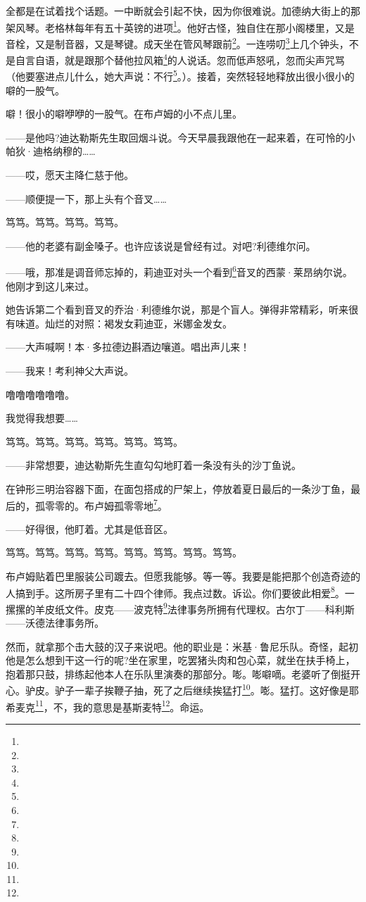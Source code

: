 \par 全都是在试着找个话题。一中断就会引起不快，因为你很难说。加德纳大街上的那架风琴。老格林每年有五十英镑的进项\footnote{}。他好古怪，独自住在那小阁楼里，又是音栓，又是制音器，又是琴键。成天坐在管风琴跟前\footnote{}。一连唠叨\footnote{}上几个钟头，不是自言自语，就是跟那个替他拉风箱\footnote{}的人说话。忽而低声怒吼，忽而尖声咒骂（他要塞进点儿什么，她大声说：不行\footnote{}。）。接着，突然轻轻地释放出很小很小的噼的一股气。
\par 噼！很小的噼咿咿的一股气。在布卢姆的小不点儿里。
\par ——是他吗?迪达勒斯先生取回烟斗说。今天早晨我跟他在一起来着，在可怜的小帕狄·迪格纳穆的……
\par ——哎，愿天主降仁慈于他。
\par ——顺便提一下，那上头有个音叉……
\par 笃笃。笃笃。笃笃。笃笃。
\par ——他的老婆有副金嗓子。也许应该说是曾经有过。对吧?利德维尔问。
\par ——哦，那准是调音师忘掉的，莉迪亚对头一个看到\footnote{}音叉的西蒙·莱昂纳尔说。他刚才到这儿来过。
\par 她告诉第二个看到音叉的乔治·利德维尔说，那是个盲人。弹得非常精彩，听来很有味道。灿烂的对照：褐发女莉迪亚，米娜金发女。
\par ——大声喊啊！本·多拉德边斟酒边嚷道。唱出声儿来！
\par ——我来！考利神父大声说。
\par 噜噜噜噜噜噜。
\par 我觉得我想要……
\par 笃笃。笃笃。笃笃。笃笃。笃笃。笃笃。
\par ——非常想要，迪达勒斯先生直勾勾地盯着一条没有头的沙丁鱼说。
\par 在钟形三明治容器下面，在面包搭成的尸架上，停放着夏日最后的一条沙丁鱼，最后的，孤零零的。布卢姆孤零零地\footnote{}。
\par ——好得很，他盯着。尤其是低音区。
\par 笃笃。笃笃。笃笃。笃笃。笃笃。笃笃。笃笃。笃笃。
\par 布卢姆贴着巴里服装公司踱去。但愿我能够。等一等。我要是能把那个创造奇迹的人搞到手。这所房子里有二十四个律师。我点过数。诉讼。你们要彼此相爱\footnote{}。一摞摞的羊皮纸文件。皮克——波克特\footnote{}法律事务所拥有代理权。古尔丁——科利斯——沃德法律事务所。
\par 然而，就拿那个击大鼓的汉子来说吧。他的职业是：米基·鲁尼乐队。奇怪，起初他是怎么想到干这一行的呢?坐在家里，吃罢猪头肉和包心菜，就坐在扶手椅上，抱着那只鼓，排练起他本人在乐队里演奏的那部分。嘭。嘭噼嘀。老婆听了倒挺开心。驴皮。驴子一辈子挨鞭子抽，死了之后继续挨猛打\footnote{}。嘭。猛打。这好像是耶希麦克\footnote{}，不，我的意思是基斯麦特\footnote{}。命运。
